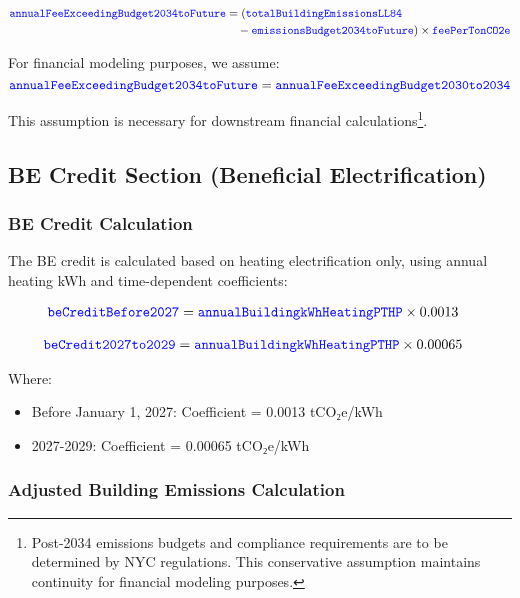 \documentclass{article}
\newcommand{\code}[1]{\textcolor{blue}{\texttt{#1}}}
\begin{document}
\begin{align}
\code{annualFeeExceedingBudget2034toFuture} &= (\code{totalBuildingEmissionsLL84} \nonumber\\
&\quad - \code{emissionsBudget2034toFuture}) \times \code{feePerTonCO2e}
\end{align}

For financial modeling purposes, we assume:
\begin{equation}
\code{annualFeeExceedingBudget2034toFuture} = \code{annualFeeExceedingBudget2030to2034}
\end{equation}

This assumption is necessary for downstream financial calculations\footnote{Post-2034 emissions budgets and compliance requirements are to be determined by NYC regulations. This conservative assumption maintains continuity for financial modeling purposes.}.

\subsection{BE Credit Section (Beneficial Electrification)}

\subsubsection{BE Credit Calculation}

The BE credit is calculated based on heating electrification only, using annual heating kWh and time-dependent coefficients:

\begin{align}
\code{beCreditBefore2027} &= \code{annualBuildingkWhHeatingPTHP} \times 0.0013
\end{align}

\begin{align}
\code{beCredit2027to2029} &= \code{annualBuildingkWhHeatingPTHP} \times 0.00065
\end{align}

Where:
\begin{itemize}
    \item Before January 1, 2027: Coefficient = 0.0013 tCO₂e/kWh
    \item 2027-2029: Coefficient = 0.00065 tCO₂e/kWh
\end{itemize}

\subsubsection{Adjusted Building Emissions Calculation}
\end{document}
